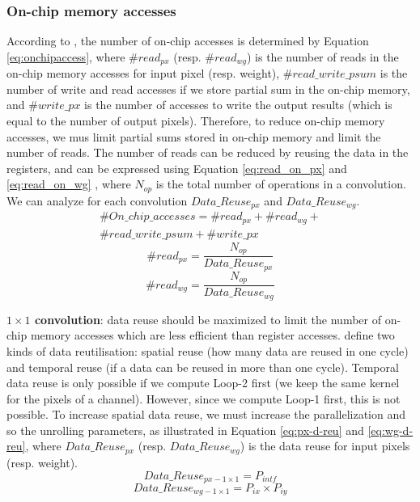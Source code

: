 \subsubsection{On-chip memory accesses}
%
According to \textcite{ma_optimizing_2018}, the number of on-chip accesses is determined by Equation \eqref{eq:onchipaccess}, where $\#read_{px}$ (resp. $\#read_{wg}$) is the number of reads in the on-chip memory accesses for input pixel (resp. weight), $\#read\_write\_psum$ is the number of write and read accesses if we store partial sum in the on-chip memory, and  $\#write\_px$ is the number of accesses to write the output results (which is equal to the number of output pixels). Therefore, to reduce on-chip memory accesses, we mus limit partial sums stored in on-chip memory and limit the number of reads.
The number of reads can be reduced by reusing the data in the registers, and can be expressed using Equation \ref{eq:read_on_px} and \ref{eq:read_on_wg} \cite{ma_optimizing_2018}, where $N_{op}$ is the total number of operations in a convolution. We can analyze for each convolution $Data\_Reuse_{px}$ and $Data\_Reuse_{wg}$.
%
\begin{multline}
    \#On\_chip\_accesses = \#read_{px} + \#read_{wg} + \\ \#read\_write\_psum + \#write\_px
    \label{eq:onchipaccess}
\end{multline}
%
\begin{equation}
    \#read_{px} = \frac{N_{op}}{Data\_Reuse_{px}}
    \label{eq:read_on_px}
\end{equation}
%
\begin{equation}
    \#read_{wg} = \frac{N_{op}}{Data\_Reuse_{wg}}
    \label{eq:read_on_wg}
\end{equation}

\textbf{$1 \times 1$ convolution}: data reuse should be maximized to limit the number of on-chip memory accesses which are less efficient than register accesses. \textcite{ma_optimizing_2018} define two kinds of data reutilisation: spatial reuse (how many data are reused in one cycle) and temporal reuse (if a data can be reused in more than one cycle). Temporal data reuse is only possible if we compute Loop-2 first (we keep the same kernel for the pixels of a channel). However, since we compute Loop-1 first, this is not possible. To increase spatial data reuse, we must increase the parallelization and so the unrolling parameters, as illustrated in Equation \eqref{eq:px-d-reu} and \eqref{eq:wg-d-reu}, where $Data\_Reuse_{px}$ (resp. $Data\_Reuse_{wg}$) is the data reuse for input pixels (resp. weight).
%
\begin{equation}
    Data\_Reuse_{px - 1 \times 1} = P_{intf}
    \label{eq:px-d-reu}
\end{equation}
\begin{equation}
    Data\_Reuse_{wg - 1 \times 1} = P_{ix} \times P_{iy}
    \label{eq:wg-d-reu}
\end{equation}

